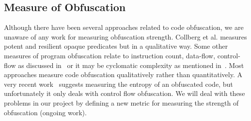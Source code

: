 \documentclass[conference]{IEEEtran}
\begin{document}
\subsection{Measure of Obfuscation}
Although there have been several approaches related to code obfuscation, we are unaware of any work for measuring obfuscation strength. Collberg et al. 
\cite{collberg} measures potent and resilient opaque predicates but in a qualitative way. Some other measures of program obfuscation relate to instruction count, data-flow, 
control-flow as discussed in~\cite{sutter} or it may be cyclomatic complexity as mentioned in~\cite{McCabe}. Most approaches measure code obfuscation qualitatively rather 
than quantitatively. A very recent work~\cite{entropy} suggests measuring the entropy of an obfuscated code, but unfortunately it only deals with control flow obfuscation. We will deal 
with these problems in our project by defining a new metric for measuring the strength of obfuscation (ongoing work).

{
 
 
}

%
%  
%



\end{document}
